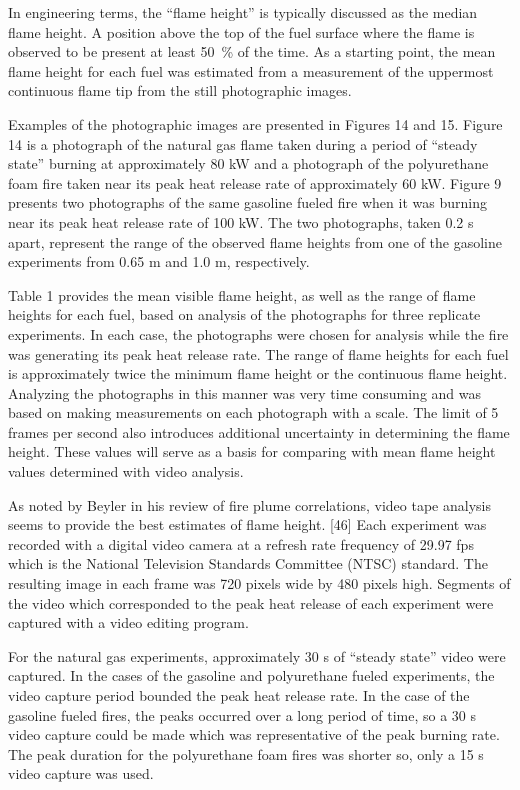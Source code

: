 \documentclass[twoside]{uocthesis}
\begin{document}
{In engineering terms, the “flame height” is typically discussed as the median flame height.  A position above the top of the fuel surface where the flame is observed to be present at least 50~\% of the time.  As a starting point, the mean flame height for each fuel was estimated from a measurement of the uppermost continuous flame tip from the still photographic images.
  
Examples of the photographic images are presented in Figures 14 and 15.  Figure 14 is a photograph of the natural gas flame taken during a period of “steady state” burning at approximately 80 kW and a photograph of the polyurethane foam fire taken near its peak heat release rate of approximately 60 kW.  Figure 9 presents two photographs of the same gasoline fueled fire when it was burning near its peak heat release rate of 100 kW.  The two photographs, taken 0.2 s apart, represent the range of the observed flame heights from one of the gasoline experiments from 0.65 m and 1.0 m, respectively.  


Table 1 provides the mean visible flame height, as well as the range of flame heights for each fuel, based on analysis of the photographs for three replicate experiments.  In each case, the photographs were chosen for analysis while the fire was generating its peak heat release rate.  The range of flame heights for each fuel is approximately twice the minimum flame height or the continuous flame height. Analyzing the photographs in this manner was very time consuming and was based on making measurements on each photograph with a scale.  The limit of 5 frames per second also introduces additional uncertainty in determining the flame height.    These values will serve as a basis for comparing with mean flame height values determined with video analysis.

As noted by Beyler in his review of fire plume correlations, video tape analysis seems to provide the best estimates of flame height. [46]  Each experiment was recorded with a digital video camera at a refresh rate frequency of 29.97 fps which is the National Television Standards Committee (NTSC) standard. The resulting image in each frame was 720 pixels wide by 480 pixels high. Segments of the video which corresponded to the peak heat release of each experiment were captured with a video editing program. 
  
For the natural gas experiments, approximately 30 s of “steady state” video were captured.  In the cases of the gasoline and polyurethane fueled experiments, the video capture period bounded the peak heat release rate.  In the case of the gasoline fueled fires, the peaks occurred over a long period of time, so a 30 s video capture could be made which was representative of the peak burning rate.  The peak duration for the polyurethane foam fires was shorter so, only a 15 s video capture was used. 

}
\end{document}
